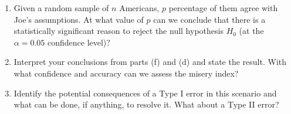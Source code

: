 \begin{enumerate}[itemsep=0.5cm]
\begin{adjustwidth}{0.3in}{0.3in}
\begin{enumerate}[itemsep=0.5cm]
                        \item Given a random sample of $n$ Americans, $p$ percentage
                              of them agree with Joe's assumptions. At what value of
                              $p$ can we conclude that there is a statistically
                              significant reason to reject the null hypothesis $H_0$
                              (at the $\alpha = 0.05$ confidence level)?

                        \item Interpret your conclusions from parts (f) and (d) and
                              state the result. With what confidence and accuracy can we
                              assess the misery index?

                        \item Identify the potential consequences of a Type I error
                              in this scenario and what can be done, if anything, to
                              resolve it. What about a Type II error?
                  \end{enumerate}
            \end{adjustwidth}
\end{enumerate}
